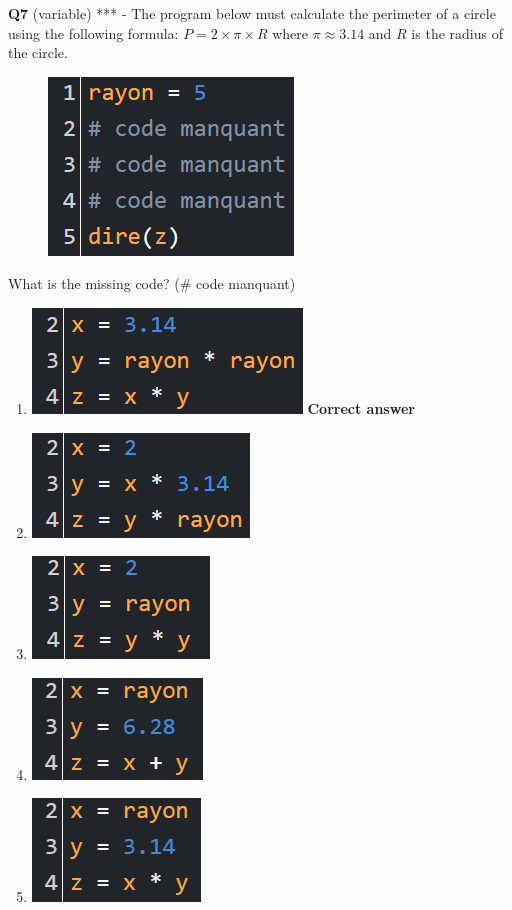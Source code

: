 \documentclass[14pt]{extarticle}
\begin{document}
\newpage
\textbf{Q7} (variable) *** - The program below must calculate the perimeter of a circle using the following formula:
$P = 2 \times \pi \times R $ where $\pi \approx 3.14$ and $R$ is the radius of the circle.
\begin{figure}[H]
    \centering
    \includegraphics[width=0.4\linewidth]{images/posttest/_Q7.png}
\end{figure}
What is the missing code? (\# code manquant)
\begin{enumerate}[label=\alph*)]
    \item \includegraphics[width=0.4\linewidth]{images/posttest/_Q7_A.png} \textbf{Correct answer}
    \item \includegraphics[width=0.35\linewidth]{images/posttest/_Q7_B.png}
    \item \includegraphics[width=0.3\linewidth]{images/posttest/_Q7_C.png}
    \item \includegraphics[width=0.3\linewidth]{images/posttest/_Q7_D.png}
    \item \includegraphics[width=0.3\linewidth]{images/posttest/_Q7_E.png}
\end{enumerate}
\end{document}
